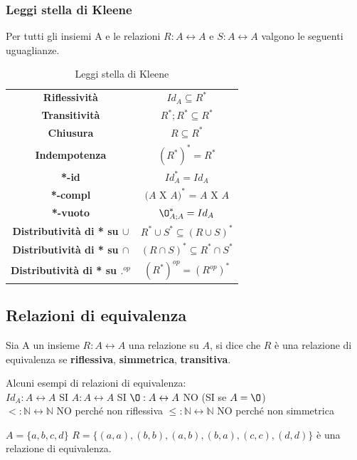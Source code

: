 \subsubsection{Leggi stella di Kleene}
Per tutti gli insiemi A e le relazioni $R: A \longleftrightarrow A$ e $S: A \longleftrightarrow A$ valgono le seguenti uguaglianze.
\begin{table}[h!]
    \centering
    \setlength{\tabcolsep}{10pt}
    \renewcommand{\arraystretch}{1.3}
    \begin{tabular}{|c|c|}
        \hline
        \textbf{Riflessività} & $Id_A \subseteq R^*$ \\
        \textbf{Transitività} & $R^*;R^* \subseteq R^*$ \\
        \textbf{Chiusura} & $R \subseteq R^*$ \\
        \textbf{Indempotenza} & $(R^*)^* = R^*$ \\
        \textbf{*-id} & $Id_A^* = Id_A$ \\
        \textbf{*-compl} & $(A$ X $A)^*$ = $A$ X $A$  \\
        \textbf{*-vuoto} & $\O_{A;A}^* = Id_A$ \\
        \textbf{Distributività di * su $\cup$} & $R^* \cup S^* \subseteq (R \cup S)^*$ \\
        \textbf{Distributività di * su $\cap$} & $(R \cap S)^* \subseteq R^* \cap S^*$ \\
        \textbf{Distributività di * su $.^{op}$} & $(R^*)^{op} = (R^{op})^*$ \\
        \hline
    \end{tabular}
    \caption{Leggi stella di Kleene}
    \label{tab:leggi-stella-Kleene}
\end{table}

\subsection{Relazioni di equivalenza}
\begin{definition}
    Sia A un insieme $R: A \leftrightarrow A$ una relazione su $A$, si dice che $R$ è una relazione di equivalenza se \textbf{riflessiva}, \textbf{simmetrica}, \textbf{transitiva}. 
\end{definition}
\begin{example}
Alcuni esempi di relazioni di equivalenza:\\
$Id_A: A \leftrightarrow A$ SI \hspace{.7cm} $A: A \leftrightarrow A$ SI \hspace{.7cm} $\O: A \leftrightarrow A$ NO (SI se $A=\O$) \\
$<: \mathbb{N} \leftrightarrow \mathbb{N}$ NO perché non riflessiva \hspace{.7cm} $\leq: \mathbb{N} \leftrightarrow \mathbb{N}$ NO perché non simmetrica
\end{example}
\begin{example}
	$A = \{a, b, c, d\}$ $R=\{(a,a), (b,b), (a,b), (b,a), (c,c), (d,d)\}$ è una relazione di equivalenza.
\end{example}

